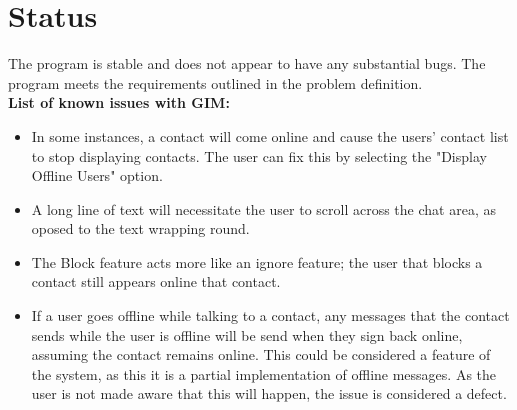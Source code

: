 \documentclass{article}
\begin{document}
\section{Status}

\label{appenstatus}

The program is stable and does not appear to have any substantial bugs. The program meets the requirements outlined in the problem definition. \\

{\bf List of known issues with GIM:}
\begin{itemize}

\item{In some instances, a contact will come online and cause the users' contact list to stop displaying contacts. The user can fix this by selecting the "Display Offline Users" option.}

\item{A long line of text will necessitate the user to scroll across the chat area, as oposed to the text wrapping round.}

\item{The Block feature acts more like an ignore feature; the user that blocks a contact still appears online that contact.}

\item{If a user goes offline while talking to a contact, any messages that the contact sends while the user is offline will be send when they sign back online, assuming the contact remains online. This could be considered a feature of the system, as this it is a partial implementation of offline messages. As the user is not made aware that this will happen, the issue is considered a defect.}

\end{itemize}
\end{document}
